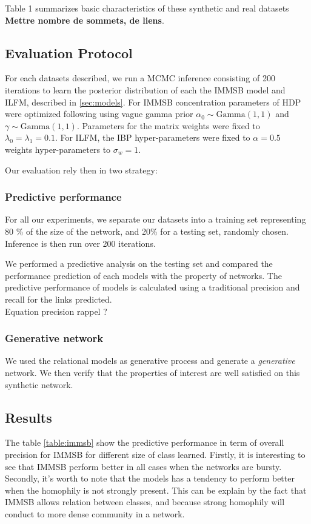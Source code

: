 Table 1 summarizes basic characteristics of these synthetic and real datasets \textbf{ Mettre nombre de sommets, de liens}.

\subsection{Evaluation Protocol}
For each datasets described,  we run a MCMC inference consisting of 200 iterations to learn the posterior distribution of each the IMMSB model and ILFM, described in \ref{sec:models}. For IMMSB concentration parameters of HDP were optimized following \cite{HDP} using vague gamma prior $\alpha_0 \sim \text{Gamma}(1,1)$ and $\gamma \sim \text{Gamma}(1,1)$. Parameters for the matrix weights were fixed to $\lambda_0=\lambda_1=0.1$. For ILFM, the IBP hyper-parameters were fixed to $\alpha=0.5$ weights hyper-parameters to $\sigma_w = 1$.

Our evaluation rely then in two strategy:



\subsubsection{Predictive performance}
For all our experiments, we separate our datasets into a training set representing 80 \% of the size of the network, and 20\% for a testing set, randomly chosen. Inference is then run over 200 iterations. 

We performed a predictive analysis on the testing set and compared the performance prediction of each models with the property of networks. 
The predictive performance of models is calculated using a traditional precision and recall for the links predicted.\\
Equation precision rappel ?

\subsubsection{Generative network}
We used the relational models as generative process and generate a \emph{generative} network. We then verify that the properties of interest are well satisfied on this synthetic network.


\subsection{Results}
The table \ref{table:immsb} show the predictive performance in term of overall precision for IMMSB for different size of class learned. Firstly, it is interesting to see that IMMSB perform better in all cases when the networks are bursty. Secondly, it's worth to note that the models has a tendency to perform better when the homophily is not strongly present. This can be explain by the fact that IMMSB allows relation between classes, and because strong homophily will conduct to more dense community in a network.



